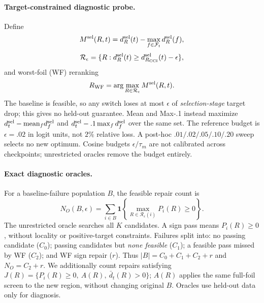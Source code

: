 \documentclass[10pt]{article}
\newcommand{\foils}{\mathcal F}
\newcommand{\regions}{\mathcal R}
\begin{document}
\paragraph{Target-constrained diagnostic probe.}
Define
\begin{equation}
M^{\rm sel}(R,t)=d_R^{\rm sel}(t)-\max_{f\in\foils_t}d_R^{\rm sel}(f),
\end{equation}
\begin{equation}
\regions_\epsilon=\{R:d_R^{\rm sel}(t)\ge d_{R_{\rm CCI}}^{\rm sel}(t)-\epsilon\},
\label{eq:feasible}
\end{equation}
and worst-foil (WF) reranking
\begin{equation}
R_{\rm WF}=\arg\max_{R\in\regions_\epsilon}M^{\rm sel}(R,t).
\label{eq:wf}
\end{equation}
The baseline is feasible, so any switch loses at most $\epsilon$ of
\emph{selection-stage} target drop; this gives no held-out guarantee.
Mean and Max-.1 instead maximize $d_t^{\rm sel}-\mathrm{mean}_f d_f^{\rm sel}$
and $d_t^{\rm sel}-.1\max_f d_f^{\rm sel}$ over the same set.
The reference budget is $\epsilon=.02$ in logit units, not $2\%$ relative
loss. A post-hoc $.01/.02/.05/.10/.20$ sweep selects no new optimum.
Cosine budgets $\epsilon/\tau_m$ are not calibrated across checkpoints;
unrestricted oracles remove the budget entirely.

\paragraph{Exact diagnostic oracles.}
For a baseline-failure population $B$, the feasible repair count is
\begin{equation}
N_O(B,\epsilon)=\sum_{i\in B}\mathbf1\!\left\{
\max_{R\in\regions_\epsilon(i)}P_i(R)\ge0\right\}.
\label{eq:oracle}
\end{equation}
The unrestricted oracle searches all $K$ candidates. A sign pass means
$P_i(R)\ge0$, without locality or positive-target constraints. Failures split
into: no passing candidate ($C_0$); passing candidates but \emph{none feasible}
($C_1$); a feasible pass missed by WF ($C_2$); and WF sign repair ($r$).
Thus $|B|=C_0+C_1+C_2+r$ and $N_O=C_2+r$. We additionally count repairs
satisfying $J(R)=\{P_i(R)\ge0,\ A(R),\ \bar d_t(R)>0\}$; $A(R)$ applies
the same full-foil screen to the new region, without changing original $B$.
Oracles use held-out data only for diagnosis.
\end{document}
